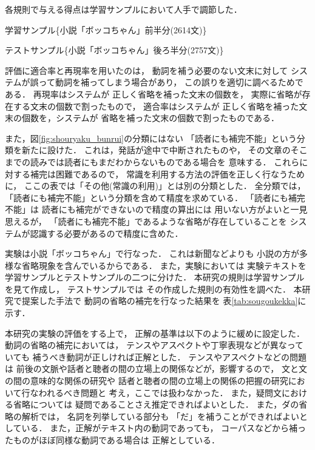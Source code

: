 \begin{table}[t]
{\begin{minipage}[h]{13.5cm}
各規則で与える得点は学習サンプルにおいて人手で調節した．\\
{
学習サンプル\{小説「ボッコちゃん」前半分(2614文)\cite{bokko}\}

テストサンプル\{小説「ボッコちゃん」後ろ半分(2757文)\cite{bokko}\}

評価に適合率と再現率を用いたのは，
動詞を補う必要のない文末に対して
システムが誤って動詞を補ってしまう場合があり，
この誤りを適切に調べるためである．
再現率はシステムが
正しく省略を補った文末の個数を，
実際に省略が存在する文末の個数で割ったもので，
適合率はシステムが
正しく省略を補った文末の個数を，システムが
省略を補った文末の個数で割ったものである．

また，図\ref{fig:shouryaku_bunrui}の分類にはない
「読者にも補完不能」という分類を新たに設けた．
これは，発話が途中で中断されたものや，
その文章のそこまでの読みでは読者にもまだわからないものである場合を
意味する．
これらに対する補完は困難であるので，
常識を利用する方法の評価を正しく行なうために，
ここの表では「その他(常識の利用)」とは別の分類とした．
全分類では，
「読者にも補完不能」という分類を含めて精度を求めている．
「読者にも補完不能」は
読者にも補完ができないので精度の算出には
用いない方がよいと一見思えるが，
「読者にも補完不能」であるような省略が存在していることを
システムが認識する必要があるので精度に含めた．
}
\end{minipage}
}
\end{table}

実験は小説「ボッコちゃん」\cite{bokko}で行なった．
これは新聞などよりも
小説の方が多様な省略現象を含んでいるからである．
また，実験においては
実験テキストを学習サンプルとテストサンプルの二つに分けた．
本研究の規則は学習サンプルを見て作成し，
テストサンプルでは
その作成した規則の有効性を調べた．
本研究で提案した手法で
動詞の省略の補完を行なった結果を
表\ref{tab:sougoukekka}に示す．

本研究の実験の評価をする上で，
正解の基準は以下のように緩めに設定した．
動詞の省略の補完においては，
テンスやアスペクトや丁寧表現などが異なっていても
補うべき動詞が正しければ正解とした．
テンスやアスペクトなどの問題は
前後の文脈や話者と聴者の間の立場上の関係などが，影響するので，
文と文の間の意味的な関係の研究や
話者と聴者の間の立場上の関係の把握の研究において行なわれるべき問題と
考え，ここでは扱わなかった．
また，疑問文における省略については
疑問であることさえ推定できればよいとした．
また，ダの省略の解析では，
名詞を列挙している部分も
「だ」を補うことができればよいとしている．
また，正解がテキスト内の動詞であっても，
コーパスなどから補ったものがほぼ同様な動詞である場合は
正解としている．

